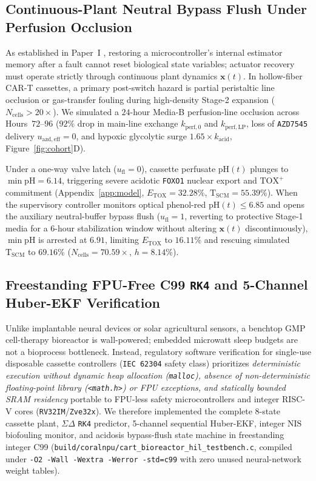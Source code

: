 \documentclass[11pt]{article}
\theoremstyle{plain}
\theoremstyle{remark}
\begin{document}
\subsection{Continuous-Plant Neutral Bypass Flush Under Perfusion Occlusion}
As established in Paper~I \cite{satz2026paper1}, restoring a microcontroller's internal estimator memory after a fault cannot reset biological state variables; actuator recovery must operate strictly through continuous plant dynamics $\mathbf{x}(t)$. In hollow-fiber CAR-T cassettes, a primary post-switch hazard is partial peristaltic line occlusion or gas-transfer fouling during high-density Stage-2 expansion ($N_{\mathrm{cells}} > 20\times$). We simulated a $24\text{-hour}$ Media-B perfusion-line occlusion across Hours~$72\text{--}96$ ($92\%$ drop in main-line exchange $k_{\mathrm{perf},0}$ and $k_{\mathrm{perf,LP}}$, loss of \texttt{AZD7545} delivery $u_{\mathrm{azd,eff}} = 0$, and hypoxic glycolytic surge $1.65\times k_{\mathrm{acid}}$, Figure~\ref{fig:cohort}D).

Under a one-way valve latch ($u_{\mathrm{fl}} = 0$), cassette perfusate $\mathrm{pH}(t)$ plunges to $\min\mathrm{pH} = 6.14$, triggering severe acidotic \texttt{FOXO1} nuclear export and $\text{TOX}^+$ commitment (Appendix~\ref{app:model}, $E_{\mathrm{TOX}} = 32.28\%$, $\mathrm{T}_{\mathrm{SCM}} = 55.39\%$). When the supervisory controller monitors optical phenol-red $\mathrm{pH}(t) \le 6.85$ and opens the auxiliary neutral-buffer bypass flush ($u_{\mathrm{fl}} = 1$, reverting to protective Stage-1 media for a $6\text{-hour}$ stabilization window without altering $\mathbf{x}(t)$ discontinuously), $\min\mathrm{pH}$ is arrested at $6.91$, limiting $E_{\mathrm{TOX}}$ to $16.11\%$ and rescuing simulated $\mathrm{T}_{\mathrm{SCM}}$ to $69.16\%$ ($N_{\mathrm{cells}} = 70.59\times$, $h = 8.14\%$).

\subsection{Freestanding FPU-Free C99 \texttt{RK4} and 5-Channel Huber-EKF Verification}
Unlike implantable neural devices or solar agricultural sensors, a benchtop GMP cell-therapy bioreactor is wall-powered; embedded microwatt sleep budgets are not a bioprocess bottleneck. Instead, regulatory software verification for single-use disposable cassette controllers (\texttt{IEC~62304} safety class) prioritizes \emph{deterministic execution without dynamic heap allocation (\texttt{malloc}), absence of non-deterministic floating-point library (\texttt{<math.h>}) or FPU exceptions, and statically bounded SRAM residency} portable to FPU-less safety microcontrollers and integer RISC-V cores (\texttt{RV32IM}/\texttt{Zve32x}). We therefore implemented the complete 8-state cassette plant, $\Sigma\Delta$ \texttt{RK4} predictor, 5-channel sequential Huber-EKF, integer $\mathrm{NIS}$ biofouling monitor, and acidosis bypass-flush state machine in freestanding integer C99 (\texttt{build/coralnpu/cart\_bioreactor\_hil\_testbench.c}, compiled under \texttt{-O2 -Wall -Wextra -Werror -std=c99} with zero unused neural-network weight tables).
\end{document}
